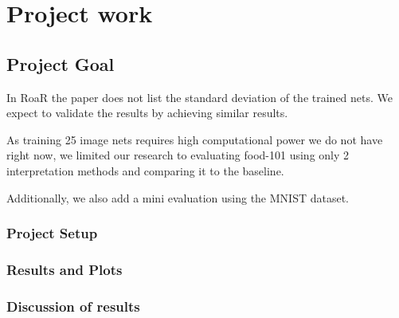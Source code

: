\chapter{Project work} %


\section{Project Goal}
In RoaR\cite{hooker2019benchmark} the paper does not list the standard deviation of the trained nets. We expect to validate the results by achieving similar results.

As training 25 image nets requires high computational power we do not have right now, we limited our research to evaluating food-101 using only 2 interpretation methods and comparing it to the baseline.


Additionally, we also add a mini evaluation using the MNIST dataset.



\subsection{Project Setup}




\subsection{Results and Plots}

\subsection{Discussion of results}






